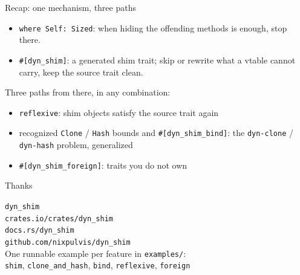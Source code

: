 \documentclass[aspectratio=169]{beamer}
\begin{document}

\begin{frame}{Recap: one mechanism, three paths}
  \begin{itemize}
    \item \texttt{where Self: Sized}: when hiding the offending methods is
          enough, stop there.
    \item \texttt{\#[dyn\_shim]}: a generated shim trait; skip or rewrite
          what a vtable cannot carry, keep the source trait clean.
  \end{itemize}
  \vspace{0.5em}
  Three paths from there, in any combination:
  \begin{itemize}
    \item \texttt{reflexive}: shim objects satisfy the source trait again
    \item recognized \texttt{Clone} / \texttt{Hash} bounds and
          \texttt{\#[dyn\_shim\_bind]}: the \texttt{dyn-clone} /
          \texttt{dyn-hash} problem, generalized
    \item \texttt{\#[dyn\_shim\_foreign]}: traits you do not own
  \end{itemize}
\end{frame}

\begin{frame}{Thanks}
  \begin{center}
    {\Large \texttt{dyn\_shim}}\\[1em]
    \texttt{crates.io/crates/dyn\_shim}\\
    \texttt{docs.rs/dyn\_shim}\\
    \texttt{github.com/nixpulvis/dyn\_shim}\\[1em]
    One runnable example per feature in \texttt{examples/}:\\
    \texttt{shim}, \texttt{clone\_and\_hash}, \texttt{bind},
    \texttt{reflexive}, \texttt{foreign}
  \end{center}
\end{frame}
\end{document}
